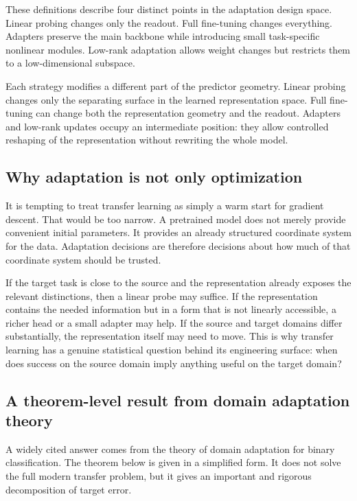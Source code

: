 These definitions describe four distinct points in the adaptation design space.
Linear probing changes only the readout.
Full fine-tuning changes everything.
Adapters preserve the main backbone while introducing small task-specific nonlinear modules.
Low-rank adaptation allows weight changes but restricts them to a low-dimensional subspace.

\begin{remark}
Each strategy modifies a different part of the predictor geometry.
Linear probing changes only the separating surface in the learned representation space.
Full fine-tuning can change both the representation geometry and the readout.
Adapters and low-rank updates occupy an intermediate position: they allow controlled reshaping of the representation without rewriting the whole model.
\end{remark}

\subsection*{Why adaptation is not only optimization}

It is tempting to treat transfer learning as simply a warm start for gradient descent.
That would be too narrow.
A pretrained model does not merely provide convenient initial parameters.
It provides an already structured coordinate system for the data.
Adaptation decisions are therefore decisions about how much of that coordinate system should be trusted.

If the target task is close to the source and the representation already exposes the relevant distinctions, then a linear probe may suffice.
If the representation contains the needed information but in a form that is not linearly accessible, a richer head or a small adapter may help.
If the source and target domains differ substantially, the representation itself may need to move.
This is why transfer learning has a genuine statistical question behind its engineering surface:
when does success on the source domain imply anything useful on the target domain?

\subsection*{A theorem-level result from domain adaptation theory}

A widely cited answer comes from the theory of domain adaptation for binary classification.
The theorem below is given in a simplified form.
It does not solve the full modern transfer problem, but it gives an important and rigorous decomposition of target error.

